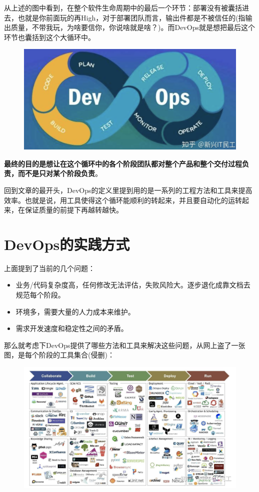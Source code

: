 \documentclass[12pt]{article}
\begin{document}
从上述的图中看到，在整个软件生命周期中的最后一个环节：部署没有被囊括进去，也就是你前面玩的再High，对于部署团队而言，输出件都是不被信任的(指输出质量，不带我玩，为啥要信你，你说啥就是啥？)。而DevOps就是想把最后这个环节也囊括到这个大循环中。

\begin{figure}[H]
    \centering
    \includegraphics[width=.6\textwidth]{fig/DevOps_Lean_DevOps.png}
\end{figure}

\textbf{最终的目的是想让在这个循环中的各个阶段团队都对整个产品和整个交付过程负责，而不是只对某个阶段负责}。

回到文章的最开头，DevOps的定义里提到用的是一系列的工程方法和工具来提高效率。也就是说，用工具使得这个循环能顺利的转起来，并且要自动化的运转起来，在保证质量的前提下再越转越快。

\section{DevOps的实践方式}
上面提到了当前的几个问题：
\begin{itemize}
\setlength{\itemsep}{0pt}
\setlength{\parsep}{0pt}
\setlength{\parskip}{0pt}
    \item 业务/代码复杂度高，任何修改无法评估，失败风险大。逐步退化成靠文档去规范每个阶段。

    \item 环境多，需要大量的人力成本来维护。
    
    \item 需求开发速度和稳定性之间的矛盾。
\end{itemize}


那么就考虑下DevOps提供了哪些方法和工具来解决这些问题，从网上盗了一张图，是每个阶段的工具集合(侵删)：
\begin{figure}[H]
    \centering
    \includegraphics[width=.6\textwidth]{fig/DevOps_Tools.png}
\end{figure}
\end{document}
